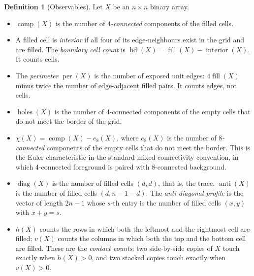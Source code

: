 \documentclass[11pt]{amsart}
\theoremstyle{definition}
\newtheorem{definition}[theorem]{Definition}
\theoremstyle{remark}
\begin{document}
\begin{definition}[Observables]
\label{def:obs}
Let $X$ be an $n \times n$ binary array.
\begin{itemize}
\item $\operatorname{comp}(X)$ is the number of \emph{$4$-connected} components of the filled cells.
\item A filled cell is \emph{interior} if all four of its edge-neighbours exist in the grid and are filled. The \emph{boundary cell count} is $\operatorname{bd}(X) = \operatorname{fill}(X) - \operatorname{interior}(X)$. It counts cells.
\item The \emph{perimeter} $\operatorname{per}(X)$ is the number of exposed unit edges: $4\operatorname{fill}(X)$ minus twice the number of edge-adjacent filled pairs. It counts edges, not cells.
\item $\operatorname{holes}(X)$ is the number of $4$-connected components of the empty cells that do not meet the border of the grid.
\item $\chi(X) = \operatorname{comp}(X) - e_8(X)$, where $e_8(X)$ is the number of \emph{$8$-connected} components of the empty cells that do not meet the border. This is the Euler characteristic in the standard mixed-connectivity convention, in which $4$-connected foreground is paired with $8$-connected background.
\item $\operatorname{diag}(X)$ is the number of filled cells $(d,d)$, that is, the trace. $\operatorname{anti}(X)$ is the number of filled cells $(d, n-1-d)$. The \emph{anti-diagonal profile} is the vector of length $2n-1$ whose $s$-th entry is the number of filled cells $(x,y)$ with $x+y=s$.
\item $h(X)$ counts the rows in which both the leftmost and the rightmost cell are filled; $v(X)$ counts the columns in which both the top and the bottom cell are filled. These are the \emph{contact counts}: two side-by-side copies of $X$ touch exactly when $h(X)>0$, and two stacked copies touch exactly when $v(X)>0$.
\end{itemize}
\end{definition}
\end{document}
